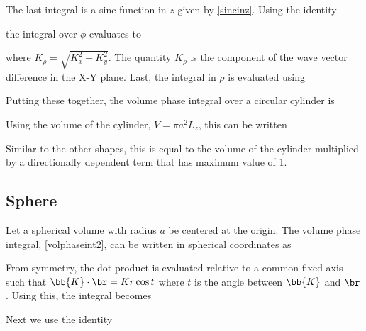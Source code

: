 The last integral is a sinc function in $z$ given by \eqref{sincinz}. Using the identity 

\noindent the integral over $\phi$ evaluates to 

\noindent where $K_{\rho} = \sqrt{K_x^2 + K_y^2}$. The quantity $K_{\rho}$ is the component of the wave vector difference in the X-Y plane. Last, the integral in $\rho$ is evaluated using

Putting these together, the volume phase integral over a circular cylinder is

Using the volume of the cylinder, $V = \pi a^2 L_z$, this can be written 

Similar to the other shapes, this is equal to the volume of the cylinder multiplied by a directionally dependent term that has maximum value of 1.  


\subsection{Sphere}

\label{sectionvolintsphere}
Let a spherical volume with radius $a$ be centered at the origin. The volume phase integral, \eqref{volphaseint2}, can be written in spherical coordinates as 
\vspace{-2mm}

From symmetry, the dot product is evaluated relative to a common fixed axis such that $\bb{K} \cdot \br = K r \cos t$  where $t$ is the angle between $\bb{K}$ and $\br$. Using this, the integral becomes
\vspace{-2mm}

Next we use the identity 

